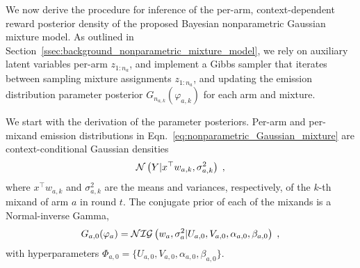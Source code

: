 We now derive the procedure for inference of the per-arm, context-dependent reward posterior density of the proposed Bayesian nonparametric Gaussian mixture model.
As outlined in Section~\ref{ssec:background_nonparametric_mixture_model}, we rely on auxiliary latent variables per-arm $z_{1:n_a}$, and implement a Gibbs sampler that iterates between sampling mixture assignments $z_{1:n_a}$, and updating the emission distribution parameter posterior $G_{n_{a,k}}(\varphi_{a,k})$ for each arm and mixture. 

We start with the derivation of the parameter posteriors.
Per-arm and per-mixand emission distributions in Eqn.~\eqref{eq:nonparametric_Gaussian_mixture} are context-conditional Gaussian densities
\begin{equation}
\mathcal{N}\left( Y|x^\top w_{a,k}, \sigma_{a,k}^2\right) \; ,
\end{equation}
where $x^\top w_{a,k}$ and $\sigma_{a,k}^2$ are the means and variances, respectively, of the $k$-th mixand of arm $a$ in round $t$.
The conjugate prior of each of the mixands is a Normal-inverse Gamma,
\begin{equation}
G_{a,0}(\varphi_a) = \mathcal{NIG}\left( w_a, \sigma_a^2 |U_{a,0}, V_{a,0},\alpha_{a,0}, \beta_{a,0}\right) \;, 
\end{equation}
with hyperparameters $\varPhi_{a,0}=\{U_{a,0}, V_{a,0},\alpha_{a,0}, \beta_{a,0}\}$.

